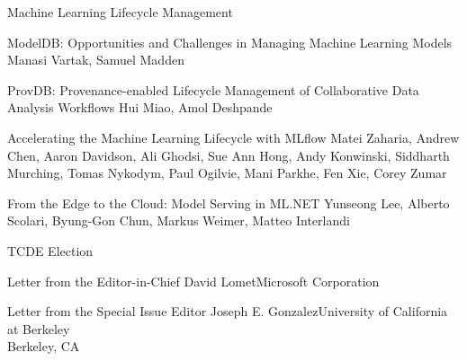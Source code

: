 \documentclass[11pt]{article}
\begin{document}
\begin{bulletin}
\begin{articlesection}{Machine Learning Lifecycle Management}
\begin{article}
{{\sc ModelDB}: Opportunities and Challenges in Managing Machine Learning Models}
{Manasi Vartak, Samuel Madden}
\graphicspath{{submissions/DEB-ModelDB/figs/}}

\end{article}


\begin{article}
{{ProvDB:} Provenance-enabled Lifecycle Management of Collaborative Data Analysis Workflows}
{Hui Miao, Amol Deshpande}
\graphicspath{{submissions/ProvDB/figs/}}

\end{article}


\begin{article}
{Accelerating the Machine Learning Lifecycle with {MLflow}}
{Matei Zaharia, Andrew Chen, Aaron Davidson, Ali Ghodsi, Sue Ann Hong, Andy Konwinski, Siddharth Murching, Tomas Nykodym, Paul Ogilvie, Mani Parkhe, Fen Xie, Corey Zumar}
\graphicspath{{submissions/mlflow/}}

\end{article}



\begin{article}
{From the Edge to the Cloud: Model Serving in ML.NET}
{Yunseong Lee, Alberto Scolari, Byung-Gon Chun, Markus Weimer, Matteo Interlandi}
\graphicspath{{submissions/model_serving_dot_net/figs/}}

\end{article}



\end{articlesection}

\begin{newssection}{TCDE Election}


\begin{news}{Letter from the Editor-in-Chief}
{David Lomet}{Microsoft Corporation}

\end{news}
%
\newpage
%
%
\begin{news}{Letter from the Special Issue Editor}
{Joseph E. Gonzalez}{University of California at Berkeley\\ Berkeley, CA}
\graphicspath{{letters/}}

\end{news}



\end{newssection}
\end{bulletin}
\end{document}
